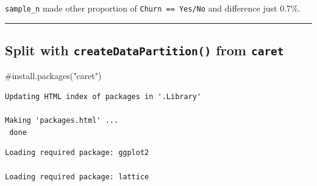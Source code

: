 \documentclass[
  letterpaper,
  DIV=11,
  numbers=noendperiod]{scrreprt}
\newenvironment{Shaded}{\begin{snugshade}}{\end{snugshade}}
\newcommand{\AttributeTok}[1]{\textcolor[rgb]{0.40,0.45,0.13}{#1}}
\newcommand{\CommentTok}[1]{\textcolor[rgb]{0.37,0.37,0.37}{#1}}
\newcommand{\ConstantTok}[1]{\textcolor[rgb]{0.56,0.35,0.01}{#1}}
\newcommand{\DecValTok}[1]{\textcolor[rgb]{0.68,0.00,0.00}{#1}}
\newcommand{\FloatTok}[1]{\textcolor[rgb]{0.68,0.00,0.00}{#1}}
\newcommand{\FunctionTok}[1]{\textcolor[rgb]{0.28,0.35,0.67}{#1}}
\newcommand{\NormalTok}[1]{\textcolor[rgb]{0.00,0.23,0.31}{#1}}
\newcommand{\OtherTok}[1]{\textcolor[rgb]{0.00,0.23,0.31}{#1}}
\newcommand{\SpecialCharTok}[1]{\textcolor[rgb]{0.37,0.37,0.37}{#1}}
\begin{document}
\texttt{sample\_n} made other proportion of \texttt{Churn\ ==\ Yes/No}
and difference just 0.7\%.

\begin{center}\rule{0.5\linewidth}{0.5pt}\end{center}

\subsection{\texorpdfstring{Split with \texttt{createDataPartition()}
from
\texttt{caret}}{Split with createDataPartition() from caret}}\label{split-with-createdatapartition-from-caret}

\begin{Shaded}
\begin{Highlighting}[]
\CommentTok{\#install.packages("caret")}
\end{Highlighting}
\end{Shaded}

\begin{verbatim}
Updating HTML index of packages in '.Library'

Making 'packages.html' ...
 done
\end{verbatim}

\begin{Shaded}
\end{Shaded}

\begin{verbatim}
Loading required package: ggplot2

Loading required package: lattice
\end{verbatim}

\begin{Shaded}
\end{Shaded}
\end{document}
